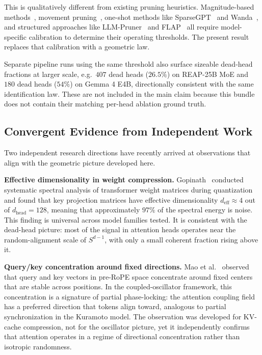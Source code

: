 \documentclass[aps,prd,onecolumn,superscriptaddress,showpacs,12pt]{revtex4-2}
\begin{document}
This is qualitatively different from existing pruning heuristics. Magnitude-based
methods~\cite{Michel2019}, movement pruning~\cite{MovementPruning2020},
one-shot methods like SparseGPT~\cite{SparseGPT2023} and
Wanda~\cite{Wanda2023}, and structured approaches like
LLM-Pruner~\cite{LLMPruner2023} and FLAP~\cite{FLAP2023} all require
model-specific calibration to determine their operating thresholds. The present
result replaces that calibration with a geometric law.

Separate pipeline runs using the same threshold also surface sizeable dead-head fractions at larger
scale, e.g.\ $407$ dead heads ($26.5\%$) on REAP-25B MoE and $180$ dead heads
($54\%$) on Gemma 4 E4B, directionally consistent with the same identification
law. These are not included in the main claim because this bundle does not
contain their matching per-head ablation ground truth.

\subsection{Convergent Evidence from Independent Work}

Two independent research directions have recently arrived at observations that
align with the geometric picture developed here.

\textbf{Effective dimensionality in weight compression.}
Gopinath~\cite{SpectralQuant2026} conducted systematic spectral analysis of
transformer weight matrices during quantization and found that key projection
matrices have effective dimensionality $d_{\mathrm{eff}} \approx 4$ out of
$d_{\mathrm{head}} = 128$, meaning that approximately $97\%$ of the spectral
energy is noise. This finding is universal across model families tested. It is
consistent with the dead-head picture: most of the signal in attention heads
operates near the random-alignment scale of $S^{d-1}$, with only a small
coherent fraction rising above it.

\textbf{Query/key concentration around fixed directions.}
Mao et al.~\cite{TriAttention2026} observed that query and key vectors in
pre-RoPE space concentrate around fixed centers that are stable across
positions. In the coupled-oscillator framework, this concentration is a
signature of partial phase-locking: the attention coupling field has a
preferred direction that tokens align toward, analogous to partial
synchronization in the Kuramoto model. The observation was developed for
KV-cache compression, not for the oscillator picture, yet it independently
confirms that attention operates in a regime of directional concentration
rather than isotropic randomness.
\end{document}
